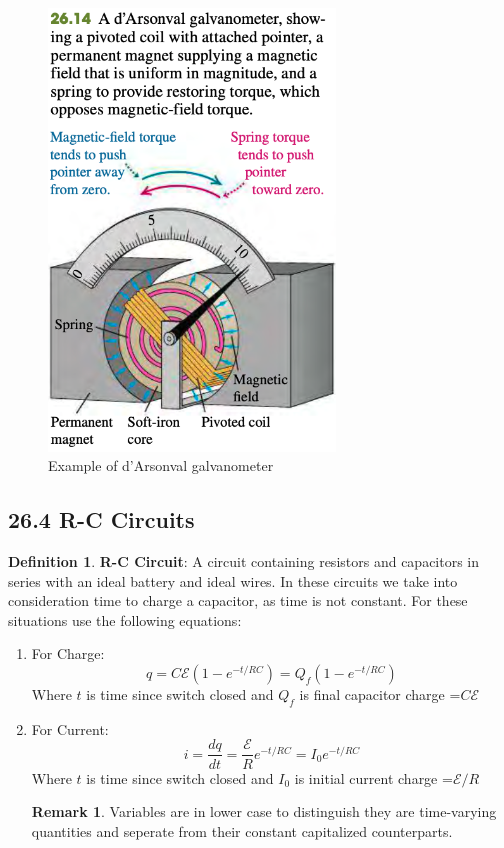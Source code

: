 \documentclass[12pt]{amsart}
\theoremstyle{definition}
\newtheorem{definition}{Definition} %
\newtheorem*{remark}{Remark}        %
\numberwithin{equation}{theorem}    %
\begin{document}
\begin{figure}[H]
    \centering
    \includegraphics[width=3in,scale=0.25]{Media/galvano.png}
    \caption{Example of d’Arsonval galvanometer}
    \label{Example of d’Arsonval galvanometer}
\end{figure}


\subsection*{26.4 R-C Circuits}

\begin{definition}
    \textbf{R-C Circuit}:
    A circuit containing resistors and capacitors in series with an ideal battery
    and ideal wires. In these circuits we take into consideration time to charge 
    a capacitor, as time is not constant. For these situations use the following
    equations:
    \begin{enumerate}
        \item For Charge: $$q = C\mathcal{E}(1-e^{-t/RC}) = Q_f(1-e^{-t/RC})$$
        Where $t$ is time since switch closed and $Q_f$ is final capacitor charge =$C\mathcal{E}$
        \item For Current: $$i = \frac{dq}{dt} = \frac{\mathcal{E}}{R}e^{-t/RC} = I_0e^{-t/RC}$$
        Where $t$ is time since switch closed and $I_0$ is initial current charge =$\mathcal{E}/R$
        \begin{remark}
            Variables are in lower case to distinguish they are time-varying quantities
            and seperate from their constant capitalized counterparts.
        \end{remark}
    \end{enumerate}
\end{definition}
\end{document}
